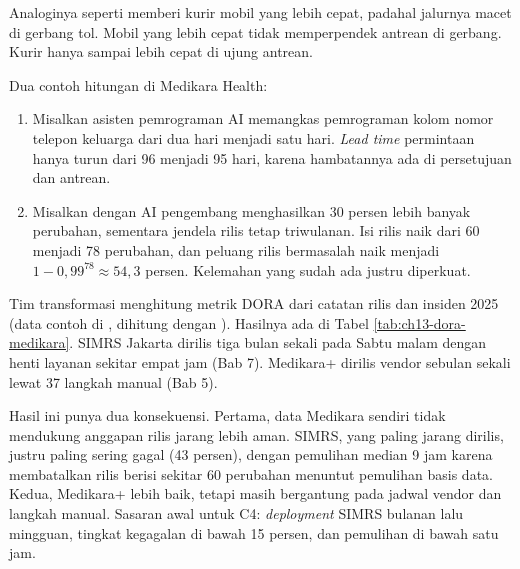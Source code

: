Analoginya seperti memberi kurir mobil yang lebih cepat, padahal jalurnya macet di gerbang tol.
Mobil yang lebih cepat tidak memperpendek antrean di gerbang. Kurir hanya sampai lebih cepat di
ujung antrean.

Dua contoh hitungan di Medikara Health:
\begin{enumerate}
  \item Misalkan asisten pemrograman AI memangkas pemrograman kolom nomor telepon keluarga dari
        dua hari menjadi satu hari. \textit{Lead time} permintaan hanya turun dari 96 menjadi 95
        hari, karena hambatannya ada di persetujuan dan antrean.
  \item Misalkan dengan AI pengembang menghasilkan 30 persen lebih banyak perubahan, sementara
        jendela rilis tetap triwulanan. Isi rilis naik dari 60 menjadi 78 perubahan, dan peluang
        rilis bermasalah naik menjadi $1 - 0{,}99^{78} \approx 54{,}3$ persen. Kelemahan yang
        sudah ada justru diperkuat.
\end{enumerate}

\begin{kasus}[title={Kasus Medikara Health: Metrik DORA SIMRS Jakarta dan Medikara+}]
  Tim transformasi menghitung metrik DORA dari catatan rilis dan insiden 2025 (data contoh di
  , dihitung dengan
  ). Hasilnya ada di Tabel
  \ref{tab:ch13-dora-medikara}. SIMRS Jakarta dirilis tiga bulan sekali pada Sabtu malam dengan
  henti layanan sekitar empat jam (Bab 7). Medikara+ dirilis vendor sebulan sekali lewat 37
  langkah manual (Bab 5).

  Hasil ini punya dua konsekuensi. Pertama, data Medikara sendiri tidak mendukung anggapan rilis
  jarang lebih aman. SIMRS, yang paling jarang dirilis, justru paling sering gagal (43 persen),
  dengan pemulihan median 9 jam karena membatalkan rilis berisi sekitar 60 perubahan menuntut
  pemulihan basis data. Kedua, Medikara+ lebih baik, tetapi masih bergantung pada jadwal vendor
  dan langkah manual. Sasaran awal untuk C4: \textit{deployment} SIMRS bulanan lalu mingguan,
  tingkat kegagalan di bawah 15 persen, dan pemulihan di bawah satu jam.
\end{kasus}

